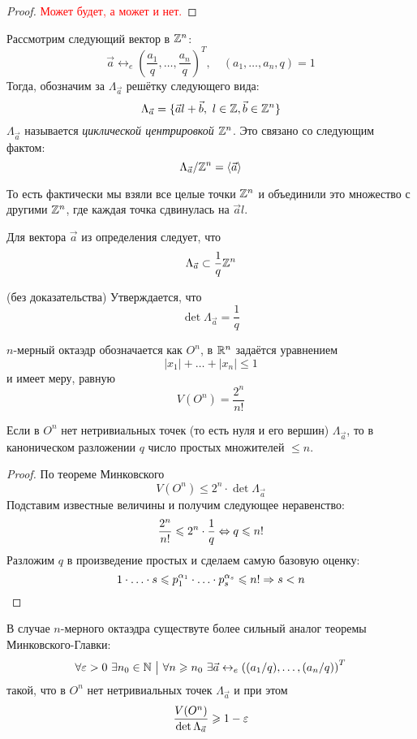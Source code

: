 \begin{proof}
	\textcolor{red}{Может будет, а может и нет.}
\end{proof}

\begin{definition}
	Рассмотрим следующий вектор в $\mathbb{Z}^n$:
	\[
		\vec{a} \leftrightarrow_e \left(\frac{a_1}{q}, \ldots, \frac{a_n}{q}\right)^T,\quad (a_1, \ldots, a_n, q) = 1
	\]
	Тогда, обозначим за $\Lambda_{\vec{a}}$ решётку следующего вида:
	\[
		\Lambda_{\vec{a}} = \{\vec{a}l + \vec{b},\ l \in \mathbb{Z}, \vec{b} \in \mathbb{Z}^n\}
	\]
	$\Lambda_{\vec{a}}$ называется \textit{циклической центрировкой} $\mathbb{Z}^n$. Это связано со следующим фактом:
	\[
		\Lambda_{\vec{a}} / \mathbb{Z}^n = \left\langle \vec{a} \right\rangle
	\]
\end{definition}

\begin{note}
	То есть фактически мы взяли все целые точки $\mathbb{Z}^n$ и объединили это множество с другими $\mathbb{Z}^n$, где каждая точка сдвинулась на $\vec{a}l$.
\end{note}

\begin{proposition}
	Для вектора $\vec{a}$ из определения следует, что
	\[
		\Lambda_{\vec{a}} \subset \frac{1}{q} \mathbb{Z}^n
	\]
\end{proposition}

\begin{theorem} (без доказательства)
	Утверждается, что
	\[
		\det \Lambda_{\vec{a}} = \frac{1}{q}
	\]
\end{theorem}

\begin{reminder}
	$n$-мерный октаэдр обозначается как $O^n$, в $\mathbb{R}^n$ задаётся уравнением
	\[
		|x_1| + \ldots + |x_n| \le 1
	\]
	и имеет меру, равную
	\[
		V(O^n) = \frac{2^n}{n!}
	\]
\end{reminder}

\begin{corollary}
	Если в $O^n$ нет нетривиальных точек (то есть нуля и его вершин) $\Lambda_{\vec{a}}$, то в каноническом разложении $q$ число простых множителей $\le n$.
\end{corollary}

\begin{proof}
	По теореме Минковского
	\[
		V(O^n) \le 2^n \cdot \det \Lambda_{\vec{a}}
	\]
	Подставим известные величины и получим следующее неравенство:
	\[
		\frac{2^n}{n!} \leqslant 2^n \cdot \frac{1}{q} \Leftrightarrow q \leqslant n!
	\]
	Разложим $q$ в произведение простых и сделаем самую базовую оценку:
	\[
		1 \cdot \ldots \cdot s \leqslant p_1^{\alpha_1} \cdot \ldots \cdot p_s^{\alpha_s} \leqslant n! \Rightarrow s < n
	\]
\end{proof}

\begin{theorem}
	В случае $n$-мерного октаэдра существуте более сильный аналог теоремы Минковского-Главки:
	\[
		\forall \varepsilon > 0\ \exists n_0 \in \mathbb{N} \ \big|\  \forall n \geqslant n_0\ \exists \vec{a} \leftrightarrow_e \left((a_1/q), \ldots, (a_n/q)\right)^T
	\]
	такой, что в $O^n$ нет нетривиальных точек $\Lambda_{\vec{a}}$ и при этом
	\[
		\frac{V(O^n)}{\det \Lambda_{\vec{a}}} \geqslant 1 - \varepsilon
	\]
\end{theorem}
